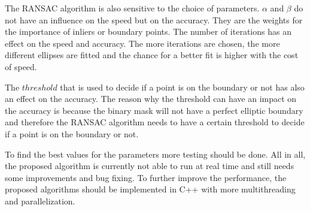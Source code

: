 The RANSAC algorithm is also sensitive to the choice of parameters. $\alpha$ and $\beta$ do not have an influence on the speed but on the accuracy. They are the weights for the importance of inliers or boundary points. The number of iterations has an effect on the speed and accuracy. The more iterations are chosen, the more different ellipses are fitted and the chance for a better fit is higher with the cost of speed.

The $threshold$ that is used to decide if a point is on the boundary or not has also an effect on the accuracy. The reason why the threshold can have an impact on the accuracy is because the binary mask will not have a perfect elliptic boundary and therefore the RANSAC algorithm needs to have a certain threshold to decide if a point is on the boundary or not. 

To find the best values for the parameters more testing should be done. All in all, the proposed algorithm is currently not able to run at real time and still needs some improvements and bug fixing. To further improve the performance, the proposed algorithms should be implemented in C++ with more multithreading and parallelization. 

